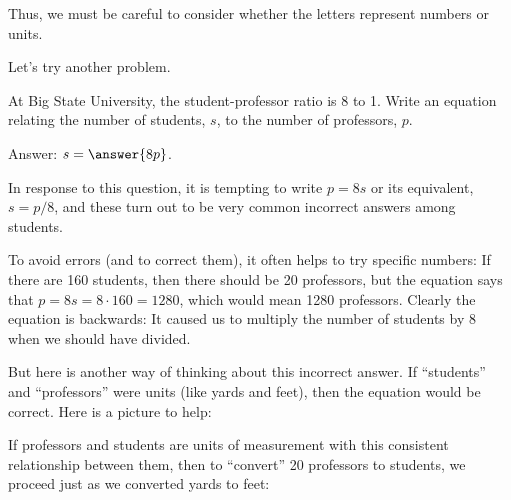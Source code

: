 \documentclass[nooutcomes]{ximera}
\begin{document}
Thus, we must be careful to consider whether the letters represent numbers or units.  

Let's try another problem.  

\begin{question}
At Big State University, the student-professor ratio is 8 to 1.  Write an equation relating the number of students, $s$, to the number of professors, $p$.  

Answer:  $s = \answer{8p}$.  
\end{question}

In response to this question, it is tempting to write $p = 8s$ or its equivalent, $s=p/8$, and these turn out to be very common incorrect answers among students.  

To avoid errors (and to correct them), it often helps to try specific numbers:  If there are 160 students, then there should be 20 professors, but the equation says that $p = 8s = 8\cdot 160 = 1280$, which would mean 1280 professors.  Clearly the equation is backwards: It caused us to multiply the number of students by 8 when we should have divided.  

But here is another way of thinking about this incorrect answer.  If ``students'' and ``professors'' were units (like yards and feet), then the equation would be correct. Here is a picture to help:  

\begin{image}
\end{image}

If professors and students are units of measurement with this consistent relationship between them, then to ``convert''  20 professors to students, we proceed just as we converted yards to feet:  
\end{document}
